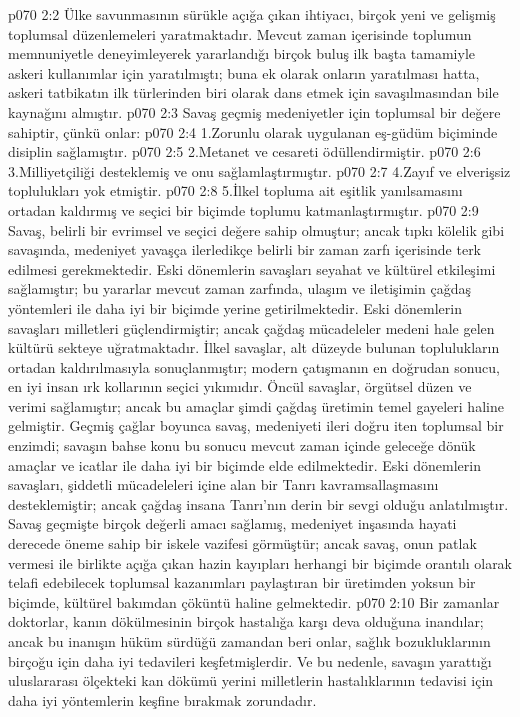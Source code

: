 \vs p070 2:2 Ülke savunmasının sürükle açığa çıkan ihtiyacı, birçok yeni ve gelişmiş toplumsal düzenlemeleri yaratmaktadır. Mevcut zaman içerisinde toplumun memnuniyetle deneyimleyerek yararlandığı birçok buluş ilk başta tamamiyle askeri kullanımlar için yaratılmıştı; buna ek olarak onların yaratılması hatta, askeri tatbikatın ilk türlerinden biri olarak dans etmek için savaşılmasından bile kaynağını almıştır.
\vs p070 2:3 Savaş geçmiş medeniyetler için toplumsal bir değere sahiptir, çünkü onlar:
\vs p070 2:4 1.\bibnobreakspace Zorunlu olarak uygulanan eş\hyp{}güdüm biçiminde disiplin sağlamıştır.
\vs p070 2:5 2.\bibnobreakspace Metanet ve cesareti ödüllendirmiştir.
\vs p070 2:6 3.\bibnobreakspace Milliyetçiliği desteklemiş ve onu sağlamlaştırmıştır.
\vs p070 2:7 4.\bibnobreakspace Zayıf ve elverişsiz toplulukları yok etmiştir.
\vs p070 2:8 5.\bibnobreakspace İlkel topluma ait eşitlik yanılsamasını ortadan kaldırmış ve seçici bir biçimde toplumu katmanlaştırmıştır.
\vs p070 2:9 Savaş, belirli bir evrimsel ve seçici değere sahip olmuştur; ancak tıpkı kölelik gibi savaşında, medeniyet yavaşça ilerledikçe belirli bir zaman zarfı içerisinde terk edilmesi gerekmektedir. Eski dönemlerin savaşları seyahat ve kültürel etkileşimi sağlamıştır; bu yararlar mevcut zaman zarfında, ulaşım ve iletişimin çağdaş yöntemleri ile daha iyi bir biçimde yerine getirilmektedir. Eski dönemlerin savaşları milletleri güçlendirmiştir; ancak çağdaş mücadeleler medeni hale gelen kültürü sekteye uğratmaktadır. İlkel savaşlar, alt düzeyde bulunan toplulukların ortadan kaldırılmasıyla sonuçlanmıştır; modern çatışmanın en doğrudan sonucu, en iyi insan ırk kollarının seçici yıkımıdır. Öncül savaşlar, örgütsel düzen ve verimi sağlamıştır; ancak bu amaçlar şimdi çağdaş üretimin temel gayeleri haline gelmiştir. Geçmiş çağlar boyunca savaş, medeniyeti ileri doğru iten toplumsal bir enzimdi; savaşın bahse konu bu sonucu mevcut zaman içinde geleceğe dönük amaçlar ve icatlar ile daha iyi bir biçimde elde edilmektedir. Eski dönemlerin savaşları, şiddetli mücadeleleri içine alan bir Tanrı kavramsallaşmasını desteklemiştir; ancak çağdaş insana Tanrı’nın derin bir sevgi olduğu anlatılmıştır. Savaş geçmişte birçok değerli amacı sağlamış, medeniyet inşasında hayati derecede öneme sahip bir iskele vazifesi görmüştür; ancak savaş, onun patlak vermesi ile birlikte açığa çıkan hazin kayıpları herhangi bir biçimde orantılı olarak telafi edebilecek toplumsal kazanımları paylaştıran bir üretimden yoksun bir biçimde, kültürel bakımdan çöküntü haline gelmektedir.
\vs p070 2:10 Bir zamanlar doktorlar, kanın dökülmesinin birçok hastalığa karşı deva olduğuna inandılar; ancak bu inanışın hüküm sürdüğü zamandan beri onlar, sağlık bozukluklarının birçoğu için daha iyi tedavileri keşfetmişlerdir. Ve bu nedenle, savaşın yarattığı uluslararası ölçekteki kan dökümü yerini milletlerin hastalıklarının tedavisi için daha iyi yöntemlerin keşfine bırakmak zorundadır.
